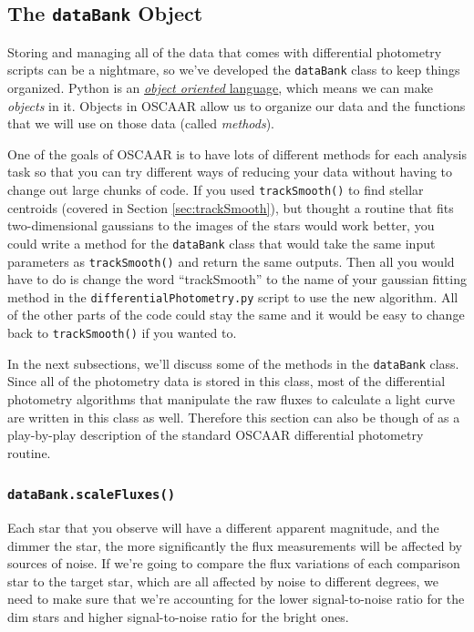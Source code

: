 \documentclass[a4paper]{article}
\newcommand{\code}[1]{\texttt{#1}}
\begin{document}
\subsection{The \code{dataBank} Object}\label{sec:databankobj}
Storing and managing all of the data that comes with differential photometry scripts can be a nightmare, so we've developed the \code{dataBank} class to keep things organized. Python is an \href{https://en.wikipedia.org/wiki/Object-oriented_programming}{\textit{object oriented} language}, which means we can make \textit{objects} in it. Objects in OSCAAR allow us to organize our data and the functions that we will use on those data (called \textit{methods}). 

One of the goals of OSCAAR is to have lots of different methods for each analysis task so that you can try different ways of reducing your data without having to change out large chunks of code. If you used \code{trackSmooth()} to find stellar centroids (covered in Section \ref{sec:trackSmooth}), but thought a routine that fits two-dimensional gaussians to the images of the stars would work better, you could write a method for the \code{dataBank} class that would take the same input parameters as \code{trackSmooth()} and return the same outputs. Then all you would have to do is change the word ``trackSmooth'' to the name of your gaussian fitting method in the \code{differentialPhotometry.py} script to use the new algorithm. All of the other parts of the code could stay the same and it would be easy to change back to \code{trackSmooth()} if you wanted to. 

In the next subsections, we'll discuss some of the methods in the \code{dataBank} class. Since all of the photometry data is stored in this class, most of the differential photometry algorithms that manipulate the raw fluxes to calculate a light curve are written in this class as well. Therefore this section can also be though of as a play-by-play description of the standard OSCAAR differential photometry routine.


\subsubsection{\code{dataBank.scaleFluxes()}}

Each star that you observe will have a different apparent magnitude, and the dimmer the star, the more significantly the flux measurements will be affected by sources of noise. If we're going to compare the flux variations of each comparison star to the target star, which are all affected by noise to different degrees, we need to make sure that we're accounting for the lower signal-to-noise ratio for the dim stars and higher signal-to-noise ratio for the bright ones. 
\end{document}
